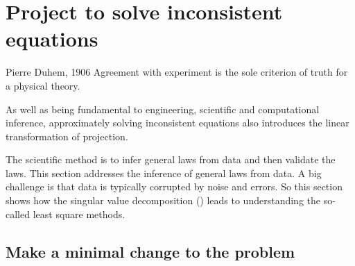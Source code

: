 

\section{Project to solve inconsistent equations}
\label{sec:asie}
\secttoc


\begin{comment}
 \cite[Ch.~7, 12]{Chartier2015}
\end{comment}

\begin{quoted}{Pierre Duhem, 1906}
Agreement with experiment is the sole criterion of truth for a physical theory.
\end{quoted}

\begin{aside}
As well as being fundamental to engineering, scientific and computational inference, approximately solving inconsistent equations also introduces the linear transformation of projection.
\end{aside}

The scientific method is to infer general laws from data and then validate the laws.
This section addresses the inference of general laws from data.
A big challenge is that data is typically corrupted by noise and errors.
So this section shows how the singular value decomposition (\svd) leads to understanding the so-called least square methods.



\subsection{Make a minimal change to the problem}
\label{sec:mmctp}

\begin{comment}
This first example introduces a new, linear algebra, view of approximation in a context that relates to students and one they know the answer.  
\end{comment}

